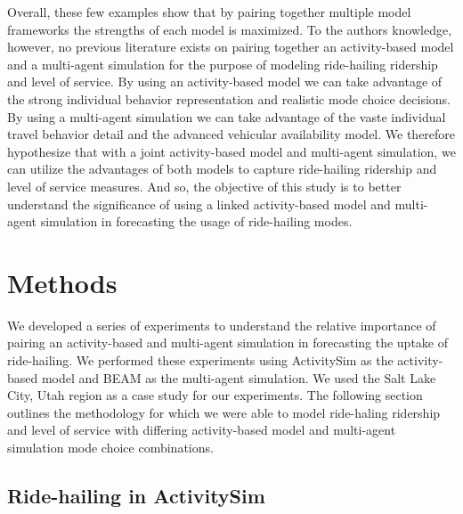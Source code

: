 \documentclass[fancy, masters]{byuthesis}
\begin{document}
Overall, these few examples show that by pairing together multiple model frameworks the strengths of each model is maximized. To the authors knowledge, however, no previous literature exists on pairing together an activity-based model and a multi-agent simulation for the purpose of modeling ride-hailing ridership and level of service. By using an activity-based model we can take advantage of the strong individual behavior representation and realistic mode choice decisions. By using a multi-agent simulation we can take advantage of the vaste individual travel behavior detail and the advanced vehicular availability model. We therefore hypothesize that with a joint activity-based model and multi-agent simulation, we can utilize the advantages of both models to capture ride-hailing ridership and level of service measures. And so, the objective of this study is to better understand the significance of using a linked activity-based model and multi-agent simulation in forecasting the usage of ride-hailing modes.

\hypertarget{meth}{%
\chapter{Methods}\label{meth}}

We developed a series of experiments to understand the relative importance of pairing an activity-based and multi-agent simulation in forecasting the uptake of ride-hailing. We performed these experiments using ActivitySim as the activity-based model and BEAM as the multi-agent simulation. We used the Salt Lake City, Utah region as a case study for our experiments. The following section outlines the methodology for which we were able to model ride-haling ridership and level of service with differing activity-based model and multi-agent simulation mode choice combinations.

\hypertarget{ride-hailing-in-activitysim}{%
\section{Ride-hailing in ActivitySim}\label{ride-hailing-in-activitysim}}
\end{document}
